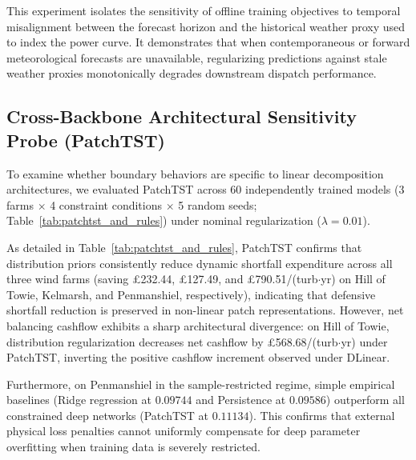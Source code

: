 This experiment isolates the sensitivity of offline training objectives to temporal misalignment between the forecast horizon and the historical weather proxy used to index the power curve. It demonstrates that when contemporaneous or forward meteorological forecasts are unavailable, regularizing predictions against stale weather proxies monotonically degrades downstream dispatch performance.

\subsection{Cross-Backbone Architectural Sensitivity Probe (PatchTST)}
To examine whether boundary behaviors are specific to linear decomposition architectures, we evaluated PatchTST \cite{nie2023patchtst} across 60 independently trained models (3 farms $\times$ 4 constraint conditions $\times$ 5 random seeds; Table~\ref{tab:patchtst_and_rules}) under nominal regularization ($\lambda=0.01$).



As detailed in Table~\ref{tab:patchtst_and_rules}, PatchTST confirms that distribution priors consistently reduce dynamic shortfall expenditure across all three wind farms (saving \pounds 232.44, \pounds 127.49, and \pounds 790.51/(turb$\cdot$yr) on Hill of Towie, Kelmarsh, and Penmanshiel, respectively), indicating that defensive shortfall reduction is preserved in non-linear patch representations. However, net balancing cashflow exhibits a sharp architectural divergence: on Hill of Towie, distribution regularization decreases net cashflow by \pounds 568.68/(turb$\cdot$yr) under PatchTST, inverting the positive cashflow increment observed under DLinear.

Furthermore, on Penmanshiel in the sample-restricted regime, simple empirical baselines (Ridge regression at $0.09744$ and Persistence at $0.09586$) outperform all constrained deep networks (PatchTST at $0.11134$). This confirms that external physical loss penalties cannot uniformly compensate for deep parameter overfitting when training data is severely restricted.
